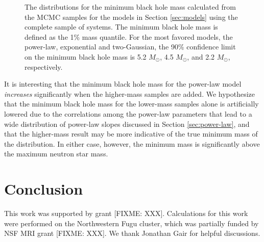 \documentclass[preprint]{aastex}
\newcommand{\fixme}[1]{[FIXME: #1]}
\newcommand{\Msun}{M_\odot}
\begin{document}
\begin{figure}
\begin{center}
  \end{center}
  \caption{\label{fig:high-min-mass} The distributions for the minimum
    black hole mass calculated from the MCMC samples for the models in
    Section \ref{sec:models} using the complete sample of systems.
    The minimum black hole mass is defined as the 1\% mass quantile.
    For the most favored models, the power-law, exponential and
    two-Gaussian, the 90\% confidence limit on the minimum black hole
    mass is 5.2 $\Msun$, 4.5 $\Msun$, and 2.2 $\Msun$, respectively.}
\end{figure}

It is interesting that the minimum black hole mass for the power-law
model \emph{increases} significantly when the higher-mass samples are
added.  We hypothesize that the minimum black hole mass for the
lower-mass samples alone is artificially lowered due to the
correlations among the power-law parameters that lead to a wide
distribution of power-law slopes discussed in Section
\ref{sec:power-law}, and that the higher-mass result may be more
indicative of the true minimum mass of the distribution.  In either
case, however, the minimum mass is significantly above the maximum
neutron star mass.

\section{Conclusion}

\acknowledgements

This work was supported by grant \fixme{XXX}.  Calculations for this
work were performed on the Northwestern Fugu cluster, which was
partially funded by NSF MRI grant \fixme{XXX}.  We thank Jonathan Gair
for helpful discussions.


\end{document}
